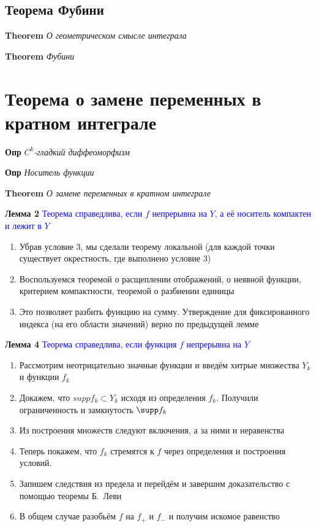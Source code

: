 \documentclass[a4paper, 14pt]{article}
\begin{document}
    \subsection{Теорема Фубини}
    
    \textbf{Theorem} \textit{О геометрическом смысле интеграла}
    
    \textbf{Theorem} \textit{Фубини}
    
    \section{Теорема о замене переменных в кратном интеграле}
    
    \textbf{Опр} \textit{$C^k$-гладкий диффеоморфизм}
    
    \textbf{Опр} \textit{Носитель функции}
    
    \textbf{Theorem} \textit{О замене переменных в кратном интеграле}
    
    \textbf{Лемма 2}
    \textcolor{blue}{Теорема справедлива, если $f$ непрерывна на $Y$, а её носитель компактен и лежит в  $Y$}
    
    \begin{enumerate}
        \item Убрав условие 3, мы сделали теорему локальной (для каждой точки существует окрестность, где выполнено
        условие 3)
        \item Воспользуемся теоремой о расщеплении отображений, о неявной функции, критерием компактности, теоремой о
        разбиении единицы
        \item Это позволяет разбить функцию на сумму.
        Утверждение для фиксированного индекса (на его области значений) верно по предыдущей лемме
    \end{enumerate}
    
    \textbf{Лемма 4}
    \textcolor{blue}{Теорема справедлива, если функция $f$ непрерывна на $Y$}
    
    \begin{enumerate}
        \item Рассмотрим неотрицательно значные функции и введём хитрые множества $Y_k$ и функции $f_k$
        \item Докажем, что $supp f_k \subset Y_k$ исходя из определения $f_k$.
        Получили ограниченность и замкнутость $\supp f_k$
        \item Из построения множеств следуют включения, а за ними и неравенства
        \item Теперь покажем, что $f_k$ стремятся к $f$ через определения и построения условий.
        \item Запишем следствия из предела и перейдём и завершим доказательство с помощью теоремы Б.~Леви
        \item В общем случае разобьём $f$ на $f_+$ и $f_-$ и получим искомое равенство
    \end{enumerate}
    
\end{document}
